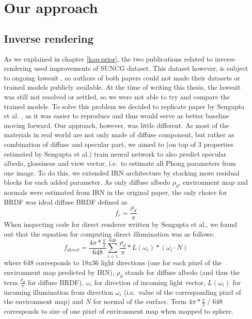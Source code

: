 \chapter{Our approach}
\label{kap:approach}

\section{Inverse rendering}
As we explained in chapter \ref{kap:prior}, the two publications related to inverse rendering used improvements of SUNCG dataset. This dataset however, is subject to ongoing lawsuit \cite{suncg-lawsuit}, so authors of both papers could not made their datasets or trained models publicly available. At the time of writing this thesis, the lawsuit was still not resolved or settled, so we were not able to try and compare the trained models.
\newline
To solve this problem we decided to replicate paper by Sengupta et al. \cite{sengupta-inverse-rendering}, as it was easier to reproduce and thus would serve as better baseline moving forward. Our approach, however, was little different. As most of the materials in real world are not only made of diffuse component, but rather as combination of diffuse and specular part, we aimed to (on top of 3 properties estimated by Sengupta et al.) train neural network to also predict specular albedo, glossiness and view vector, i.e.\ to estimate all Phong parameters from one image. To do this, we extended IRN architecture by stacking more residual blocks for each added parameter.
\newline
As only diffuse albedo $\rho_d$, environment map and normals were estimated from IRN in the original paper, the only choice for BRDF was ideal diffuse BRDF defined as 
\begin{equation}
    \label{eq:diffuse-brdf}
    f_r = \frac{\rho_d}{\pi}
\end{equation}
When inspecting code for direct renderer written by Sengupta et al., we found out that the equation for computing direct illumination was as follows:
\begin{equation}
    f_{direct} = \frac{4\pi * \frac{\pi}{2}}{648} \sum_{i = 1}^{648} \frac{\rho_d}{\pi} * L(\omega_i) * (\omega_i \cdot N) 
    \label{eq:sengupta-direct}
\end{equation}
where 648 corresponds to 18x36 light directions (one for each pixel of the environment map predicted by IRN), $\rho_d$ stands for diffuse albedo (and thus the term $\frac{\rho_d}{\pi}$ for diffuse BRDF), $\omega_i$ for direction of incoming light vector, $L(\omega_i)$ for incoming illumination from direction $\omega_i$ (i.e.\ value of the corresponding pixel of the environment map) and $N$ for normal of the surface. Term $4\pi * \frac{\pi}{2} \; / \; 648$ corresponds to size of one pixel of environment map when mapped to sphere.
